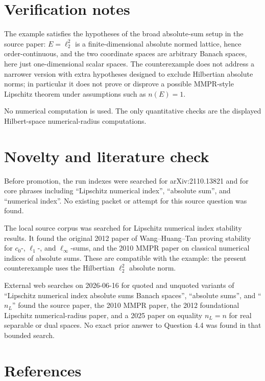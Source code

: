 \documentclass[11pt]{article}
\begin{document}
\section*{Verification notes}

The example satisfies the hypotheses of the broad absolute-sum setup in the source paper: \(E=\ell_2^2\) is a finite-dimensional absolute normed lattice, hence order-continuous, and the two coordinate spaces are arbitrary Banach spaces, here just one-dimensional scalar spaces.  The counterexample does not address a narrower version with extra hypotheses designed to exclude Hilbertian absolute norms; in particular it does not prove or disprove a possible MMPR-style Lipschitz theorem under assumptions such as \(n(E)=1\).

No numerical computation is used.  The only quantitative checks are the displayed Hilbert-space numerical-radius computations.

\section*{Novelty and literature check}

Before promotion, the run indexes were searched for arXiv:2110.13821 and for core phrases including ``Lipschitz numerical index'', ``absolute sum'', and ``numerical index''.  No existing packet or attempt for this source question was found.

The local source corpus was searched for Lipschitz numerical index stability results.  It found the original 2012 paper of Wang--Huang--Tan proving stability for \(c_0\)-, \(\ell_1\)-, and \(\ell_\infty\)-sums, and the 2010 MMPR paper on classical numerical indices of absolute sums.  These are compatible with the example: the present counterexample uses the Hilbertian \(\ell_2^2\) absolute norm.

External web searches on 2026-06-16 for quoted and unquoted variants of ``Lipschitz numerical index absolute sums Banach spaces'', ``absolute sums'', and ``\(n_L\)'' found the source paper, the 2010 MMPR paper, the 2012 foundational Lipschitz numerical-radius paper, and a 2025 paper on equality \(n_L=n\) for real separable or dual spaces.  No exact prior answer to Question 4.4 was found in that bounded search.

\section*{References}
\end{document}
